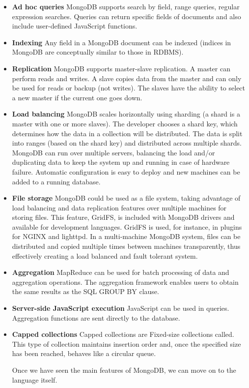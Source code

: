 \begin{itemize}

\item \textbf{Ad hoc queries} 
MongoDB supports search by field, range queries, regular expression searches. Queries can return specific fields of documents and also include user-defined JavaScript functions.

\item \textbf{Indexing} 
Any field in a MongoDB document can be indexed (indices in MongoDB are conceptually similar to those in RDBMS).

\item \textbf{Replication} 
MongoDB supports master-slave replication. A master can perform reads and writes. A slave copies data from the master and can only be used for reads or backup (not writes). The slaves have the ability to select a new master if the current one goes down.

\item \textbf{Load balancing} 
MongoDB scales horizontally using sharding (a shard is a master with one or more slaves). The developer chooses a shard key, which determines how the data in a collection will be distributed. The data is split into ranges (based on the shard key) and distributed across multiple shards. MongoDB can run over multiple servers, balancing the load and/or duplicating data to keep the system up and running in case of hardware failure. Automatic configuration is easy to deploy and new machines can be added to a running database.

\item \textbf{File storage} 
MongoDB could be used as a file system, taking advantage of load balancing and data replication features over multiple machines for storing files. This feature, GridFS, is included with MongoDB drivers and available for development languages. GridFS is used, for instance, in plugins for NGINX and lighttpd. In a multi-machine MongoDB system, files can be distributed and copied multiple times between machines transparently, thus effectively creating a load balanced and fault tolerant system.

\item \textbf{Aggregation} 
MapReduce can be used for batch processing of data and aggregation operations. The aggregation framework enables users to obtain the same results as the SQL GROUP BY clause.

\item \textbf{Server-side JavaScript execution} 
JavaScript can be used in queries. Aggregation functions are sent directly to the database.

\item \textbf{Capped collections} 
Capped collections are Fixed-size collections called. This type of collection maintains insertion order and, once the specified size has been reached, behaves like a circular queue.

Once we have seen the main features of MongoDB, we can move on to the language itself.
\end{itemize}


